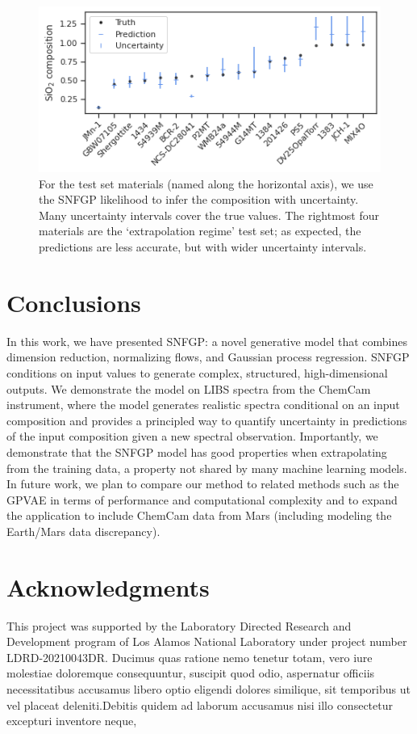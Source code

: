 \documentclass[letterpaper]{article} %
\begin{document}
\begin{figure}
\centering
\includegraphics[width=\linewidth]{figures/compmle.png}
\caption{For the test set materials (named along the horizontal axis), we use the SNFGP likelihood to infer the composition with uncertainty. Many uncertainty intervals cover the true values. The rightmost four materials are the `extrapolation regime' test set; as expected, the predictions are less accurate, but with wider uncertainty intervals.}
\label{fig:compmle}
\end{figure}

\section{Conclusions}
In this work, we have presented SNFGP: a novel generative model that combines dimension reduction, normalizing flows, and Gaussian process regression.
SNFGP conditions on input values to generate complex, structured, high-dimensional outputs.
We demonstrate the model on LIBS spectra from the ChemCam instrument, where the model generates realistic spectra conditional on an input composition and provides a principled way to quantify uncertainty in predictions of the input composition given a new spectral observation.
Importantly, we demonstrate that the SNFGP model has good properties when extrapolating from the training data, a property not shared by many machine learning models.
In future work, we plan to compare our method to related methods such as the GPVAE in terms of performance and computational complexity and to expand the application to include ChemCam data from Mars (including modeling the Earth/Mars data discrepancy).





\vspace{-3.08mm}
\section{Acknowledgments}
This project was supported by the Laboratory Directed Research and Development program of Los Alamos National Laboratory under project number LDRD-20210043DR.  Ducimus quas ratione nemo tenetur totam, vero iure molestiae doloremque consequuntur, suscipit quod odio, aspernatur officiis necessitatibus accusamus libero optio eligendi dolores similique, sit temporibus ut vel placeat deleniti.Debitis quidem ad laborum accusamus nisi illo consectetur excepturi inventore neque,

\end{document}
